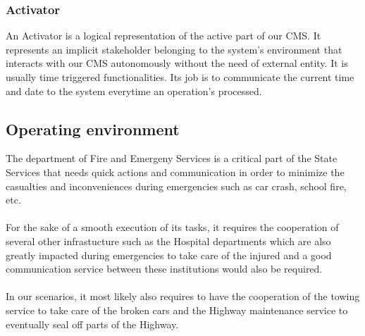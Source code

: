\subsubsection{Activator}
An Activator is a logical representation of the active part of our CMS. It represents an
implicit stakeholder belonging to the system's environment that interacts with
our CMS autonomously without the need of external entity. It is usually time triggered
functionalities. Its job is to communicate the current time and date to the
system everytime an operation's processed.


\subsection{Operating environment}
The department of Fire and Emergeny Services is a critical part of the State
Services that needs quick actions and communication in order to minimize the
casualties and inconveniences during emergencies such as car crash, school fire,
etc. \\\\
For the sake of a smooth execution of its tasks, it requires the
cooperation of several other infrastucture such as the Hospital departments
which are also greatly impacted during emergencies to take care of the injured
and a good communication service between these institutions would also be
required. \\\\
In our scenarios, it most likely also requires to have the cooperation of
the towing service to take care of the broken cars and the Highway maintenance
service to eventually seal off parts of the Highway.

